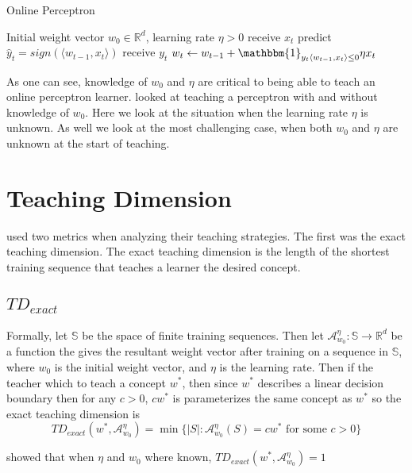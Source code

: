 \documentclass{article}
\begin{document}
\begin{algorithm}
\caption{Online Perceptron}
\begin{algorithmic}[1]
	\REQUIRE Initial weight vector $w_0 \in \mathbb{R}^d$, learning rate $\eta > 0$
    	\STATE receive $x_t$
    	\STATE predict $\hat{y}_t = sign(\langle w_{t-1} , x_t \rangle)$
    	\STATE receive $y_t$
    	\STATE $w_t \leftarrow w_{t-1} + \mathbbm{1}_{y_t \langle w_{t-1} , x_t \rangle \leq 0} \eta x_t$
    \ENDFOR
\end{algorithmic}
\end{algorithm}

As one can see, knowledge of $w_0$ and $\eta$ are critical to being able to teach an online perceptron learner. \cite{perceptron} looked at teaching a perceptron with and without knowledge of $w_0$. Here we look at the situation when the learning rate $\eta$ is unknown. As well we look at the most challenging case, when both $w_0$ and $\eta$ are unknown at the start of teaching. 


\section{Teaching Dimension}
\cite{perceptron} used two metrics when analyzing their teaching strategies. The first was the exact 
teaching dimension. The exact teaching dimension is the length of the shortest training sequence that 
teaches a learner the desired concept. 

\subsection{$TD_{exact}$}

Formally, let $\mathbb{S}$ be the space of finite training 
sequences. Then let $\mathcal{A}_{w_0}^{\eta} : \mathbb{S} \to \mathbb{R}^d$ be a function the gives the 
resultant weight vector after training on a sequence in $\mathbb{S}$, where $w_0$ is the initial weight 
vector, and $\eta$ is the learning rate. Then if the teacher which to teach a concept $w^*$, then since $w^*$ describes a linear decision boundary then for any $c > 0$, $cw^*$ is parameterizes the same concept as $w^*$
so the exact teaching dimension is 
$$
TD_{exact}(w^*, \mathcal{A}_{w_0}^\eta) = \min\{ \lvert S \rvert : 
\mathcal{A}_{w_0}^\eta(S) = cw^* \text{ for some } c >0 \}
$$

\cite{perceptron} showed that when $\eta$ and $w_0$ where known, $TD_{exact}(w^*, \mathcal{A}_{w_0}^\eta) = 1$
\end{document}
